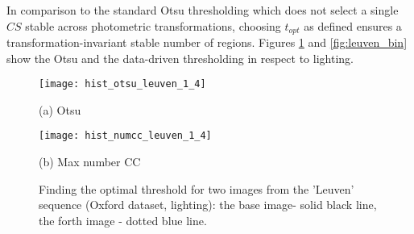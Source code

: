\documentclass[conference,compsoc]{IEEEtran}
\begin{document}
In comparison to the standard Otsu thresholding which does not select a single $CS$ stable across photometric transformations, choosing $t_{opt}$ as defined ensures a transformation-invariant stable number of regions. Figures \ref{fig:binary_hist} and \ref{fig:leuven_bin} show the Otsu and the data-driven thresholding in respect to lighting.
\begin{figure}[htb]

\begin{minipage}[b]{0.99\linewidth}
  \centering
  \centerline{\texttt{[image: hist\_otsu\_leuven\_1\_4]}}
  \centerline{(a) Otsu}\medskip
\end{minipage}
\hfill
\begin{minipage}[b]{0.99\linewidth}
  \centering
  \centerline{\texttt{[image: hist\_numcc\_leuven\_1\_4]}}
\centerline{(b) Max number CC}\medskip
\end{minipage}
\hfill
\caption{Finding the optimal threshold for two images from the 'Leuven' sequence 
(Oxford dataset, lighting): the base image- solid black line, the forth image - dotted blue line.}
\label{fig:binary_hist}
%
\end{figure}
\end{document}
